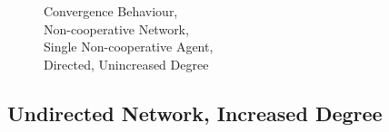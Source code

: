 \documentclass[a4paper, 12pt]{report}
\begin{document}
\begin{figure}[!htbp]
\begin{minipage}{.45\linewidth}
    \end{minipage}\par\medskip
    \centering
    
    \caption{Convergence Behaviour, \\ Non-cooperative Network, \\ Single Non-cooperative Agent, \\ Directed, Unincreased Degree}
\end{figure}

\newpage

\subsection{Undirected Network, Increased Degree}
\end{document}
